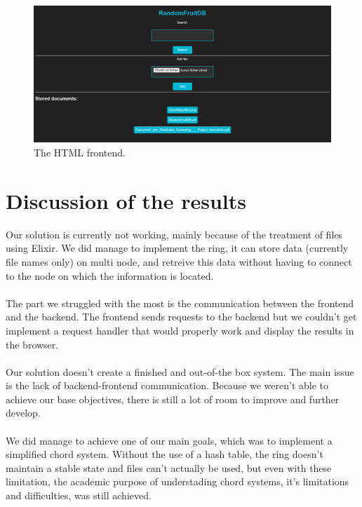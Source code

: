 \documentclass{article}
\begin{document}
\begin{figure}[H]
  \centering
  \includegraphics[width=\textwidth]{img/html.png}
  \caption{The HTML frontend.}
  \label{figure 3 :}
\end{figure}


\section{Discussion of the results}
Our solution is currently not working, mainly because of the treatment of files using Elixir. We did manage to implement the ring, it can store data (currently file names only) on multi node, and retreive this data without having to connect to the node on which the information is located.
\\\\
The part we struggled with the most is the communication between the frontend and the backend. The frontend sends requests to the backend but we couldn't get implement a request handler that would properly work and display the results in the browser.
\\\\
Our solution doesn't create a finished and out-of-the box system. The main issue is the lack of backend-frontend communication. Because we weren't able to achieve our base objectives, there is still a lot of room to improve and further develop.
\\\\
We did manage to achieve one of our main goals, which was to implement a simplified chord system. Without the use of a hash table, the ring doesn't maintain a stable state and files can't actually be used, but even with these limitation, the academic purpose of understading chord systems, it's limitations and difficulties, was still achieved.




\pagebreak
\end{document}
